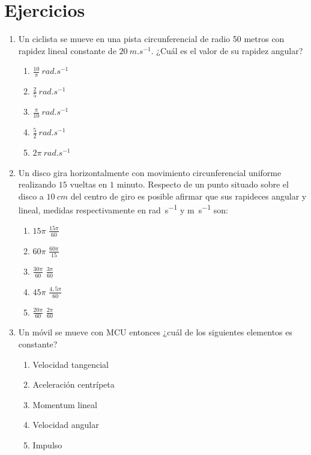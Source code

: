 \documentclass[letterpaper]{article}
\begin{document}
                                                                                                                
\section*{Ejercicios}


\begin{enumerate}

\item Un ciclista se mueve en una pista circunferencial de radio 50 metros con rapidez lineal constante de $20\ \si{m.s^{-1}}$. ¿Cuál es el valor de su rapidez angular?
\begin{enumerate}[label=\Alph*)]
\item $\frac{10}{\pi}\ \si{rad.s^{-1}}$
\item $\frac{2}{5}\ \si{rad.s^{-1}}$
\item $\frac{\pi}{10}\ \si{rad.s^{-1}}$
\item $\frac{5}{2}\ \si{rad.s^{-1}}$
\item $2\pi\ \si{rad.s^{-1}}$
\end{enumerate}

\item Un disco gira horizontalmente con movimiento circunferencial uniforme realizando $15$ vueltas en $1$ minuto. Respecto de un punto situado sobre el disco a $10\ \si{cm}$ del centro de giro es posible afirmar que sus rapideces angular y lineal, medidas respectivamente en \si{rad.s^{-1}} y \si{m.s^{-1}} son:
\begin{enumerate}[label=\Alph*)]
\item $15\pi$ \quad $\frac{15\pi}{60}$
\item $60\pi$ \quad $\frac{60\pi}{15}$
\item $\frac{30\pi}{60}$ \quad $\frac{3\pi}{60}$
\item $45\pi$ \quad $\frac{4,5\pi}{60}$
\item $\frac{20\pi}{60}$ \quad $\frac{2\pi}{60}$
\end{enumerate}

\item Un móvil se mueve con MCU entonces ¿cuál de los siguientes elementos es constante?
\begin{enumerate}[label=\Alph*)]
\item Velocidad tangencial
\item Aceleración centrípeta
\item Momentum lineal
\item Velocidad angular
\item Impulso
\end{enumerate}


\end{enumerate}
\end{document}
